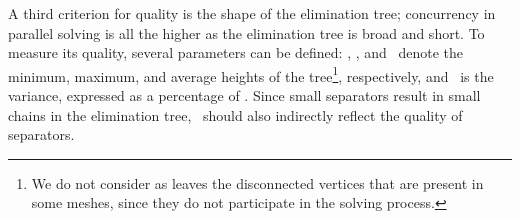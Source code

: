 A third criterion for quality is the shape of the elimination tree;
concurrency in parallel solving is all the higher as the elimination tree is
broad and short. To measure its quality, several parameters can be defined:
\hmin, \hmax, and \havg\ denote the minimum, maximum, and average heights
of the tree\footnote%
{We do not consider as leaves the disconnected vertices that are present in
some meshes, since they do not participate in the solving process.},
respectively, and \hdlt\ is the variance, expressed as a percentage of \havg.
Since small separators result in small chains in the elimination tree,
\havg\ should also indirectly reflect the quality of separators.

